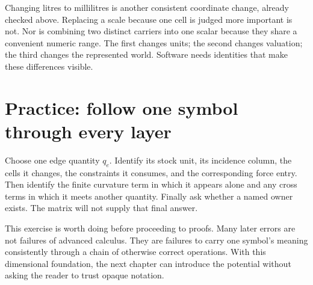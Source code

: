 Changing litres to millilitres is another consistent coordinate change,
already checked above. Replacing a scale because one cell is judged more
important is not. Nor is combining two distinct carriers into one scalar
because they share a convenient numeric range. The first changes units;
the second changes valuation; the third changes the represented world.
Software needs identities that make these differences visible.

\section{Practice: follow one symbol through every layer}
Choose one edge quantity $q_e$. Identify its stock unit, its incidence
column, the cells it changes, the constraints it consumes, and the
corresponding force entry. Then identify the finite curvature term in
which it appears alone and any cross terms in which it meets another
quantity. Finally ask whether a named owner exists. The matrix will not
supply that final answer.

This exercise is worth doing before proceeding to proofs. Many later
errors are not failures of advanced calculus. They are failures to carry
one symbol's meaning consistently through a chain of otherwise correct
operations. With this dimensional foundation, the next chapter can
introduce the potential without asking the reader to trust opaque notation.
